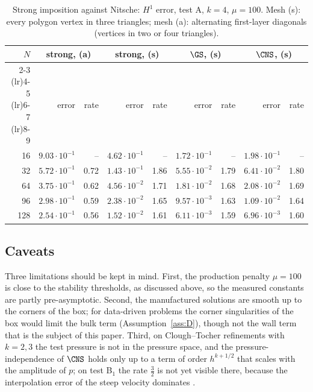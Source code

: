 \begin{table}[t]
\centering\small
\caption{Strong imposition against Nitsche: $H^1$ error, test A, $k=4$, $\mu=100$. Mesh (s): every polygon vertex in three triangles; mesh (a): alternating first-layer diagonals (vertices in two or four triangles).}\label{tab:strong}
\begin{tabular}{rrrrrrrrr}
\toprule
$N$ & \multicolumn{2}{c}{strong, (a)} & \multicolumn{2}{c}{strong, (s)} & \multicolumn{2}{c}{$\GS$, (s)} & \multicolumn{2}{c}{$\CNS$, (s)}\\
\cmidrule(lr){2-3} \cmidrule(lr){4-5} \cmidrule(lr){6-7} \cmidrule(lr){8-9}
 & error & rate & error & rate & error & rate & error & rate\\
\midrule
16 & $9.03\cdot10^{-1}$ & -- & $4.62\cdot10^{-1}$ & -- & $1.72\cdot10^{-1}$ & -- & $1.98\cdot10^{-1}$ & --\\
32 & $5.72\cdot10^{-1}$ & 0.72 & $1.43\cdot10^{-1}$ & 1.86 & $5.55\cdot10^{-2}$ & 1.79 & $6.41\cdot10^{-2}$ & 1.80\\
64 & $3.75\cdot10^{-1}$ & 0.62 & $4.56\cdot10^{-2}$ & 1.71 & $1.81\cdot10^{-2}$ & 1.68 & $2.08\cdot10^{-2}$ & 1.69\\
96 & $2.98\cdot10^{-1}$ & 0.59 & $2.38\cdot10^{-2}$ & 1.65 & $9.57\cdot10^{-3}$ & 1.63 & $1.09\cdot10^{-2}$ & 1.64\\
128 & $2.54\cdot10^{-1}$ & 0.56 & $1.52\cdot10^{-2}$ & 1.61 & $6.11\cdot10^{-3}$ & 1.59 & $6.96\cdot10^{-3}$ & 1.60\\
\bottomrule
\end{tabular}
\end{table}

\subsection{Caveats}
Three limitations should be kept in mind. First, the production penalty $\mu=100$ is close to the stability thresholds, as discussed above, so the measured constants are partly pre-asymptotic. Second, the manufactured solutions are smooth up to the corners of the box; for data-driven problems the corner singularities of the box would limit the bulk term (Assumption~\ref{ass:D}), though not the wall term that is the subject of this paper. Third, on Clough--Tocher refinements with $k=2,3$ the test pressure is not in the pressure space, and the pressure-independence of $\CNS$ holds only up to a term of order $h^{k+1/2}$ that scales with the amplitude of $p$; on test B$_1$ the rate $\frac32$ is not yet visible there, because the interpolation error of the steep velocity dominates \cite{PadhiExt}.
